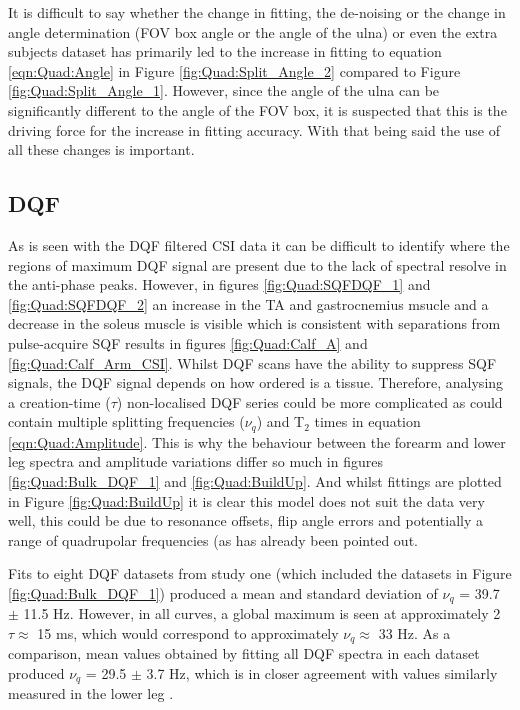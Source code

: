 It is difficult to say whether the change in fitting, the de-noising  or the change in angle determination (\ac{FOV} box angle or the angle of the ulna) or even the extra subjects dataset has primarily led to the increase in fitting to equation \ref{eqn:Quad:Angle} in Figure \ref{fig:Quad:Split_Angle_2} compared to Figure \ref{fig:Quad:Split_Angle_1}. However, since the angle of the ulna can be significantly different to the angle of the \ac{FOV} box, it is suspected that this is the driving force for the increase in fitting accuracy. With that being said the use of all these changes is important.

\subsection{DQF}

As is seen with the \ac{DQF} filtered \ac{CSI} data it can be difficult to identify where the regions of maximum \ac{DQF} signal are present due to the lack of spectral resolve in the anti-phase peaks. However, in figures \ref{fig:Quad:SQFDQF_1} and \ref{fig:Quad:SQFDQF_2} an increase in the \ac{TA} and gastrocnemius msucle and a decrease in the soleus muscle is visible which is consistent with separations from pulse-acquire \ac{SQF} results in figures \ref{fig:Quad:Calf_A} and \ref{fig:Quad:Calf_Arm_CSI}. Whilst \ac{DQF} scans have the ability to suppress \ac{SQF} signals, the \ac{DQF} signal depends on how ordered is a tissue. Therefore, analysing a creation-time ($\tau$) non-localised \ac{DQF} series could be more complicated as could contain multiple splitting frequencies ($\nu_q$) and T$_2$ times in equation \ref{eqn:Quad:Amplitude}. This is why the behaviour between the forearm and lower leg spectra and amplitude variations differ so much in figures \ref{fig:Quad:Bulk_DQF_1} and \ref{fig:Quad:BuildUp}. And whilst fittings are plotted in Figure \ref{fig:Quad:BuildUp} it is clear this model does not suit the data very well, this could be due to resonance offsets, flip angle errors and potentially a range of quadrupolar frequencies \cite{Sharf1995DetectionNMR-Spectroscopy} (as has already been pointed out. 

Fits to eight \ac{DQF} datasets from study one (which included the datasets in Figure \ref{fig:Quad:Bulk_DQF_1}) produced a mean and standard deviation of $\nu_q$ = 39.7 $\pm$ 11.5 Hz. However, in all curves, a global maximum is seen at approximately 2$\tau \approx$ 15 ms, which would correspond to approximately $\nu_q \approx$ 33 Hz. As a comparison, mean values obtained by fitting all \ac{DQF} spectra in each dataset produced $\nu_q$ = 29.5 $\pm$ 3.7 Hz, which is in closer agreement with values similarly measured in the lower leg \cite{Gursan2022ResidualMuscle}. 

